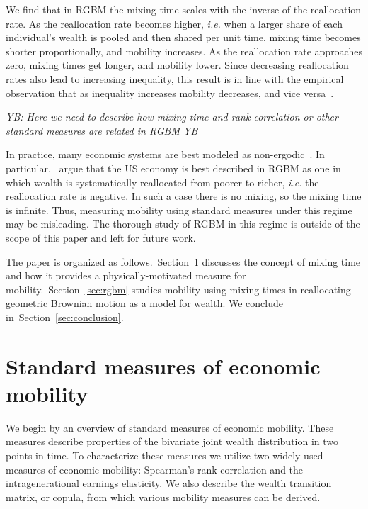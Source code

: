 \documentclass[11pt]{article}
\newcommand{\blue}[1]{{\color{blue} #1}}
\newcommand{\Sref}[1]{Section~\ref{sec:#1}}
\newcommand{\ie}{{\it i.e.}\xspace}
\newcommand{\YB}[1]{\blue{{\it YB: #1 YB}}}
\numberwithin{equation}{section}
\begin{document}
We find that in RGBM the mixing time scales with the inverse of the reallocation rate. As the reallocation rate becomes higher, \ie when a larger share of each individual's wealth is pooled and then shared per unit time, mixing time becomes shorter proportionally, and mobility increases. As the reallocation rate approaches zero, mixing times get longer, and mobility lower. Since decreasing reallocation rates also lead to increasing inequality, this result is in line with the empirical observation that as inequality increases mobility decreases, and vice versa~\citep{corak2013}.

\YB{Here we need to describe how mixing time and rank correlation or other standard measures are related in RGBM}

In practice, many economic systems are best modeled as non-ergodic~\citep{Peters2019b}. In particular,~\citet{BermanPetersAdamou2019} argue that the US economy is best described in RGBM as one in which wealth is systematically reallocated from poorer to richer, \ie the reallocation rate is negative. In such a case there is no mixing, so the mixing time is infinite. Thus, measuring mobility using standard measures under this regime may be misleading. The thorough study of RGBM in this regime is outside of the scope of this paper and left for future work.

The paper is organized as follows.~\Sref{mixingtime} discusses the concept of mixing time and how it provides a physically-motivated measure for mobility.~\Sref{rgbm} studies mobility using mixing times in reallocating geometric Brownian motion as a model for wealth. We conclude in~\Sref{conclusion}.

\section{Standard measures of economic mobility}\label{sec:mixingtime}

We begin by an overview of standard measures of economic mobility. These measures describe properties of the bivariate joint wealth distribution in two points in time. To characterize these measures we utilize two widely used measures of economic mobility: Spearman's rank correlation and the intragenerational earnings elasticity. We also describe the wealth transition matrix, or copula, from which various mobility measures can be derived.
\end{document}
